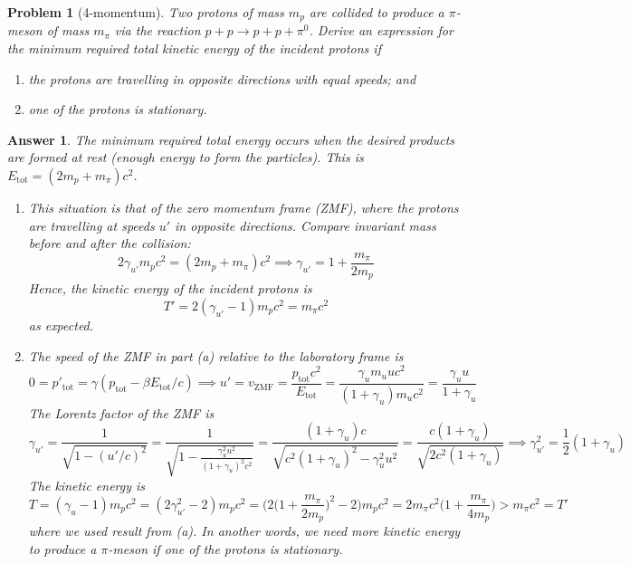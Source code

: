\documentclass[a4paper]{article}
\theoremstyle{new2}
\newtheorem{ans}{Answer}[section]
\theoremstyle{new}
\newtheorem{qns}{Problem}[section]
\begin{document}
\begin{qns}[4-momentum]
Two protons of mass $m_p$ are collided to produce a $\pi$-meson of mass $m_\pi$ via the reaction  $p+p\rightarrow p+p+\pi^0$. Derive an expression for the minimum required total kinetic energy of the incident protons if 
\begin{enumerate}[label=(\alph*)]
\item the protons are travelling in opposite directions with equal speeds; and 
\item one of the protons is stationary.
\end{enumerate}
\end{qns}
\begin{ans}
The minimum required total energy occurs when the desired products are formed at rest (enough energy to form the particles). This is $E_{\text{tot}}=(2m_p+m_\pi)c^2$. 
\begin{enumerate}[label=(\alph*)]
\item This situation is that of the zero momentum frame (ZMF), where the protons are travelling at speeds $u'$ in opposite directions. Compare invariant mass before and after the collision:
$$2\gamma_{u'}m_pc^2=(2m_p+m_\pi)c^2\implies\gamma_{u'}=1+\frac{m_\pi}{2m_p}$$
Hence, the kinetic energy of the incident protons is
$$T'=2(\gamma_{u'}-1)m_pc^2=m_\pi c^2$$
as expected.
\item The speed of the ZMF in part (a) relative to the laboratory frame is
$$0=p'_{\text{tot}}=\gamma(p_{\text{tot}}-\beta E_{\text{tot}}/c)\implies u'=v_{\text{ZMF}}=\frac{p_{\text{tot}}c^2}{E_{\text{tot}}}=\frac{\gamma_um_uuc^2}{(1+\gamma_u)m_uc^2}=\frac{\gamma_uu}{1+\gamma_u}$$
The Lorentz factor of the ZMF is
$$\gamma_{u'}=\frac{1}{\sqrt{1-(u'/c)^2}}=\frac{1}{\sqrt{1-\frac{\gamma_u^2u^2}{(1+\gamma_u)^2c^2}}}=\frac{(1+\gamma_u)c}{\sqrt{c^2(1+\gamma_u)^2-\gamma_u^2u^2}}=\frac{c(1+\gamma_u)}{\sqrt{2c^2(1+\gamma_u)}}\implies\gamma_{u'}^2=\frac{1}{2}(1+\gamma_u)$$
The kinetic energy is
$$T=(\gamma_u-1)m_pc^2=(2\gamma_{u'}^2-2)m_pc^2=\bigg(2\bigg(1+\frac{m_\pi}{2m_p}\bigg)^2-2\bigg)m_pc^2=2m_\pi c^2\bigg(1+\frac{m_\pi}{4m_p}\bigg)>m_\pi c^2=T'$$
where we used result from (a). In another words, we need more kinetic energy to produce a $\pi$-meson if one of the protons is stationary.
\end{enumerate}
\end{ans}
\newpage
\end{document}
